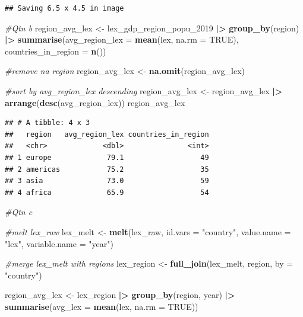 \documentclass[
]{article}
\newenvironment{Shaded}{\begin{snugshade}}{\end{snugshade}}
\newcommand{\AttributeTok}[1]{\textcolor[rgb]{0.13,0.29,0.53}{#1}}
\newcommand{\CommentTok}[1]{\textcolor[rgb]{0.56,0.35,0.01}{\textit{#1}}}
\newcommand{\ConstantTok}[1]{\textcolor[rgb]{0.56,0.35,0.01}{#1}}
\newcommand{\FunctionTok}[1]{\textcolor[rgb]{0.13,0.29,0.53}{\textbf{#1}}}
\newcommand{\NormalTok}[1]{#1}
\newcommand{\OtherTok}[1]{\textcolor[rgb]{0.56,0.35,0.01}{#1}}
\newcommand{\SpecialCharTok}[1]{\textcolor[rgb]{0.81,0.36,0.00}{\textbf{#1}}}
\newcommand{\StringTok}[1]{\textcolor[rgb]{0.31,0.60,0.02}{#1}}
\begin{document}
\begin{verbatim}
## Saving 6.5 x 4.5 in image
\end{verbatim}

\begin{Shaded}
\begin{Highlighting}[]
\CommentTok{\#Qtn b}
\NormalTok{region\_avg\_lex }\OtherTok{\textless{}{-}}\NormalTok{ lex\_gdp\_region\_popu\_2019 }\SpecialCharTok{|\textgreater{}} \FunctionTok{group\_by}\NormalTok{(region) }\SpecialCharTok{|\textgreater{}} \FunctionTok{summarise}\NormalTok{(}\AttributeTok{avg\_region\_lex =} \FunctionTok{mean}\NormalTok{(lex, }\AttributeTok{na.rm =} \ConstantTok{TRUE}\NormalTok{), }\AttributeTok{countries\_in\_region =} \FunctionTok{n}\NormalTok{())}

\CommentTok{\#remove na region}
\NormalTok{region\_avg\_lex }\OtherTok{\textless{}{-}} \FunctionTok{na.omit}\NormalTok{(region\_avg\_lex)}

\CommentTok{\#sort by avg\_region\_lex descending}
\NormalTok{region\_avg\_lex }\OtherTok{\textless{}{-}}\NormalTok{ region\_avg\_lex }\SpecialCharTok{|\textgreater{}} \FunctionTok{arrange}\NormalTok{(}\FunctionTok{desc}\NormalTok{(avg\_region\_lex))}
\NormalTok{region\_avg\_lex}
\end{Highlighting}
\end{Shaded}

\begin{verbatim}
## # A tibble: 4 x 3
##   region   avg_region_lex countries_in_region
##   <chr>             <dbl>               <int>
## 1 europe             79.1                  49
## 2 americas           75.2                  35
## 3 asia               73.0                  59
## 4 africa             65.9                  54
\end{verbatim}

\begin{Shaded}
\begin{Highlighting}[]
\CommentTok{\#Qtn c}

\CommentTok{\#melt lex\_raw}
\NormalTok{lex\_melt }\OtherTok{\textless{}{-}} \FunctionTok{melt}\NormalTok{(lex\_raw, }\AttributeTok{id.vars =} \StringTok{"country"}\NormalTok{, }\AttributeTok{value.name =} \StringTok{"lex"}\NormalTok{, }\AttributeTok{variable.name =} \StringTok{"year"}\NormalTok{)}



\CommentTok{\#merge lex\_melt with regions}
\NormalTok{lex\_region }\OtherTok{\textless{}{-}} \FunctionTok{full\_join}\NormalTok{(lex\_melt, region, }\AttributeTok{by =} \StringTok{"country"}\NormalTok{)}

\NormalTok{region\_avg\_lex }\OtherTok{\textless{}{-}}\NormalTok{ lex\_region }\SpecialCharTok{|\textgreater{}} \FunctionTok{group\_by}\NormalTok{(region, year) }\SpecialCharTok{|\textgreater{}} \FunctionTok{summarise}\NormalTok{(}\AttributeTok{avg\_lex =} \FunctionTok{mean}\NormalTok{(lex, }\AttributeTok{na.rm =} \ConstantTok{TRUE}\NormalTok{))}
\end{Highlighting}
\end{Shaded}
\end{document}
